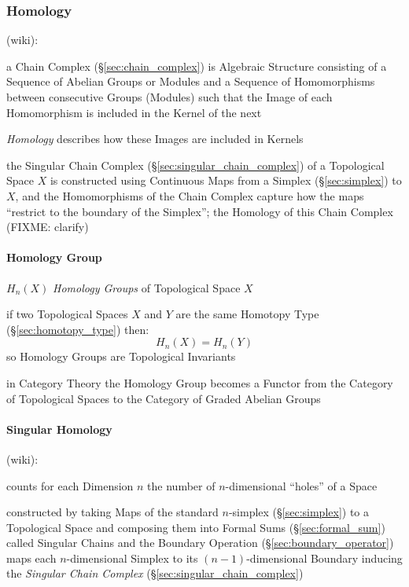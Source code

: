 \subsubsection{Homology}\label{sec:homology}

(wiki):

a Chain Complex (\S\ref{sec:chain_complex}) is Algebraic Structure consisting
of a Sequence of Abelian Groups or Modules and a Sequence of Homomorphisms
between consecutive Groups (Modules) such that the Image of each Homomorphism
is included in the Kernel of the next

\emph{Homology} describes how these Images are included in Kernels

the Singular Chain Complex (\S\ref{sec:singular_chain_complex}) of a
Topological Space $X$ is constructed using Continuous Maps from a Simplex
(\S\ref{sec:simplex}) to $X$, and the Homomorphisms of the Chain Complex
capture how the maps ``restrict to the boundary of the Simplex''; the Homology
of this Chain Complex (FIXME: clarify)



\paragraph{Homology Group}\label{sec:homology_group}\hfill

$H_n(X)$ \emph{Homology Groups} of Topological Space $X$

if two Topological Spaces $X$ and $Y$ are the same Homotopy Type
(\S\ref{sec:homotopy_type}) then:
\[
  H_n(X) = H_n(Y)
\]
so Homology Groups are Topological Invariants

in Category Theory the Homology Group becomes a Functor from the Category of
Topological Spaces to the Category of Graded Abelian Groups



\paragraph{Singular Homology}\label{sec:homology}\hfill

(wiki):

counts for each Dimension $n$ the number of $n$-dimensional ``holes'' of a
Space

constructed by taking Maps of the standard $n$-simplex (\S\ref{sec:simplex}) to
a Topological Space and composing them into Formal Sums
(\S\ref{sec:formal_sum}) called Singular Chains and the Boundary Operation
(\S\ref{sec:boundary_operator}) maps each $n$-dimensional Simplex to its
$(n-1)$-dimensional Boundary inducing the \emph{Singular Chain Complex}
(\S\ref{sec:singular_chain_complex})

